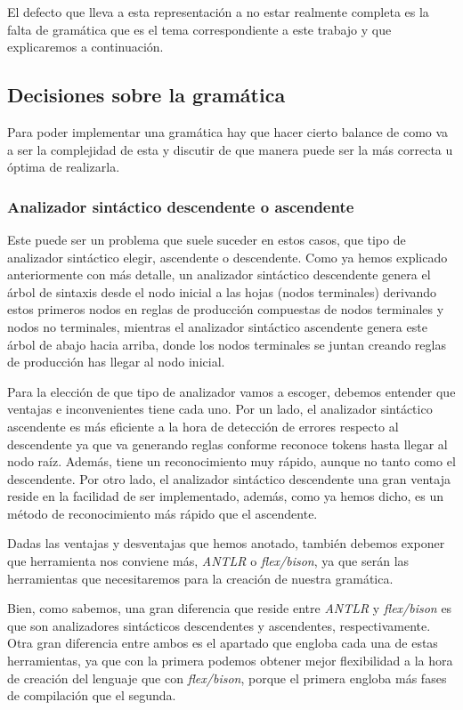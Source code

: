 \documentclass{article}
\begin{document}
    El defecto que lleva a esta representación a no estar realmente completa es la falta de gramática que es el tema correspondiente
    a este trabajo y que explicaremos a continuación.

    \subsection{Decisiones sobre la gramática}
    Para poder implementar una gramática hay que hacer cierto balance de como va a ser la complejidad de esta y discutir
    de que manera puede ser la más correcta u óptima de realizarla.
    \subsubsection{Analizador sintáctico descendente o ascendente}
    Este puede ser un problema que suele suceder en estos casos, que tipo de analizador sintáctico elegir, ascendente o
    descendente.
    Como ya hemos explicado anteriormente con más detalle, un analizador sintáctico descendente genera el árbol de sintaxis
    desde el nodo inicial a las hojas (nodos terminales) derivando estos primeros nodos en reglas de producción compuestas
    de nodos terminales y nodos no terminales, mientras el analizador sintáctico ascendente genera este árbol de abajo hacia
    arriba, donde los nodos terminales se juntan creando reglas de producción has llegar al nodo inicial.

    Para la elección de que tipo de analizador vamos a escoger, debemos entender que ventajas e inconvenientes tiene cada
    uno. Por un lado, el analizador sintáctico ascendente es más eficiente a la hora de detección de errores respecto al
    descendente ya que va generando reglas conforme reconoce tokens hasta llegar al nodo raíz. Además, tiene
    un reconocimiento muy rápido, aunque no tanto como el descendente. Por otro lado, el analizador sintáctico descendente
    una gran ventaja reside en la facilidad de ser implementado, además, como ya hemos dicho, es un método de reconocimiento
    más rápido que el ascendente.

    Dadas las ventajas y desventajas que hemos anotado, también debemos exponer que herramienta nos conviene más, \textit{ANTLR}
    o \textit{flex/bison}, ya que serán las herramientas que necesitaremos para la creación de nuestra gramática.

    Bien, como sabemos, una gran diferencia que reside entre \textit{ANTLR} y \textit{flex/bison} es que son analizadores
    sintácticos descendentes y ascendentes, respectivamente. Otra gran diferencia entre ambos es el apartado que engloba
    cada una de estas herramientas, ya que con la primera podemos obtener mejor flexibilidad a la hora de creación del lenguaje
    que con \textit{flex/bison}, porque el primera engloba más fases de compilación que el segunda.
\end{document}
